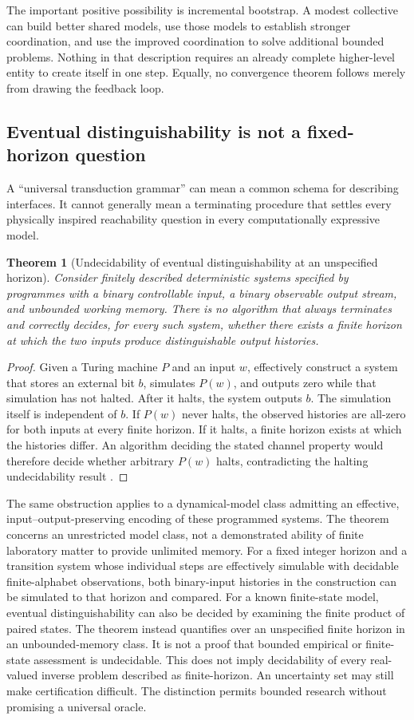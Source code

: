 \documentclass[11pt,a4paper]{article}
\newtheorem{theorem}{Theorem}[section]
\theoremstyle{definition}
\theoremstyle{remark}
\begin{document}
The important positive possibility is incremental bootstrap. A modest collective can build better shared models, use those models to establish stronger coordination, and use the improved coordination to solve additional bounded problems. Nothing in that description requires an already complete higher-level entity to create itself in one step. Equally, no convergence theorem follows merely from drawing the feedback loop.

\subsection{Eventual distinguishability is not a fixed-horizon question}
A ``universal transduction grammar'' can mean a common schema for describing interfaces. It cannot generally mean a terminating procedure that settles every physically inspired reachability question in every computationally expressive model.

\begin{theorem}[Undecidability of eventual distinguishability at an unspecified horizon]\label{thm:undecidable}
Consider finitely described deterministic systems specified by programmes with a binary controllable input, a binary observable output stream, and unbounded working memory. There is no algorithm that always terminates and correctly decides, for every such system, whether there exists a finite horizon at which the two inputs produce distinguishable output histories.
\end{theorem}
\begin{proof}
Given a Turing machine $P$ and an input $w$, effectively construct a system that stores an external bit $b$, simulates $P(w)$, and outputs zero while that simulation has not halted. After it halts, the system outputs $b$. The simulation itself is independent of $b$. If $P(w)$ never halts, the observed histories are all-zero for both inputs at every finite horizon. If it halts, a finite horizon exists at which the histories differ. An algorithm deciding the stated channel property would therefore decide whether arbitrary $P(w)$ halts, contradicting the halting undecidability result \citep{turing}.
\end{proof}
The same obstruction applies to a dynamical-model class admitting an effective, input--output-preserving encoding of these programmed systems. The theorem concerns an unrestricted model class, not a demonstrated ability of finite laboratory matter to provide unlimited memory. For a fixed integer horizon and a transition system whose individual steps are effectively simulable with decidable finite-alphabet observations, both binary-input histories in the construction can be simulated to that horizon and compared. For a known finite-state model, eventual distinguishability can also be decided by examining the finite product of paired states. The theorem instead quantifies over an unspecified finite horizon in an unbounded-memory class. It is not a proof that bounded empirical or finite-state assessment is undecidable. This does not imply decidability of every real-valued inverse problem described as finite-horizon. An uncertainty set may still make certification difficult. The distinction permits bounded research without promising a universal oracle.
\end{document}
